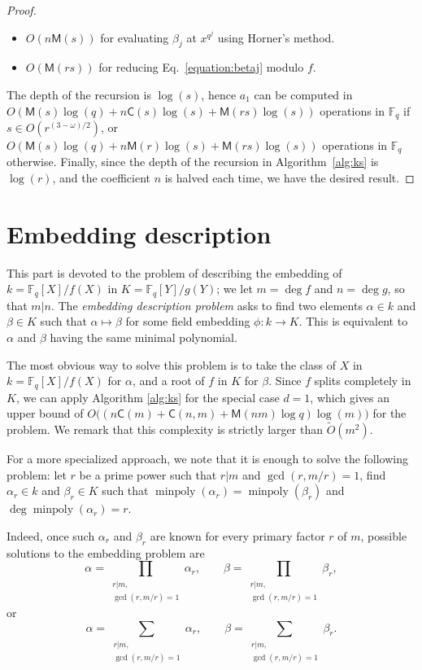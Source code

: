 \documentclass[12pt]{article}
\theoremstyle{plain}
\theoremstyle{definition}
\newcommand{\tildO}{\tilde{O}}
\DeclareMathOperator{\minpoly}{minpoly}
\def\F{\ensuremath{\mathbb{F}}}
\def\MM{\ensuremath{\mathsf{M}}}
\def\CC{\ensuremath{\mathsf{C}}}
\begin{document}
\begin{proof}
\begin{itemize}
	\item $O(n\MM(s))$ for evaluating $\beta_j$ at $x^{q^j}$ using Horner's method.
	\item $O(\MM(rs))$ for reducing Eq.~\eqref{equation:betaj} modulo $f$.
\end{itemize}
The depth of the recursion is $\log(s)$, hence $a_1$ can be computed in $O(\MM(s)\log(q) + 
n\CC(s)\log(s) + \MM(rs)\log(s))$ operations in $\F_q$ if $s \in O(r^{(3 - \omega) / 2})$, or
$O(\MM(s)\log(q) + n\MM(r)\log(s) + \MM(rs)\log(s))$ operations in $\F_q$ otherwise. Finally, since 
the depth of the recursion in Algorithm~\ref{alg:ks} is $\log(r)$, and the coefficient $n$ is 
halved each time, we have the desired result.
\end{proof}









\part{Embedding description}

This part is devoted to the problem of describing the embedding of
$k=\F_q[X]/f(X)$ in $K=\F_q[Y]/g(Y)$; we let $m=\deg f$ and
$n=\deg g$, so that $m|n$. The \emph{embedding description problem}
asks to find two elements $\alpha\in k$ and $\beta\in K$ such that
$\alpha\mapsto\beta$ for some field embedding $\phi:k\to K$. This is
equivalent to $\alpha$ and $\beta$ having the same minimal polynomial.

The most obvious way to solve this problem is to take the class of $X$
in $k=\F_q[X]/f(X)$ for $\alpha$, and a root of $f$ in $K$ for
$\beta$. Since $f$ splits completely in $K$, we can apply Algorithm
\ref{alg:ks} for the special case $d = 1$, which gives an upper bound
of $O\bigl((n\CC(m) + \CC(n,m) + \MM(nm)\log q)\log(m)\bigr)$ for the
problem. We remark that this complexity is strictly larger than
$\tildO(m^2)$.

For a more specialized approach, we note that it is enough to solve
the following problem: let $r$ be a prime power such that $r|m$ and
$\gcd(r,m/r)=1$, find $\alpha_r\in k$ and $\beta_r\in K$ such that
$\minpoly(\alpha_r)=\minpoly(\beta_r)$ and $\deg\minpoly(\alpha_r)=r$.

Indeed, once such $\alpha_r$ and $\beta_r$ are known for every primary
factor $r$ of $m$, possible solutions to the embedding problem are
\begin{equation*}
  \alpha = \prod_{\substack{r|m,\\\gcd(r,m/r)=1}}\alpha_r,\qquad
  \beta = \prod_{\substack{r|m,\\\gcd(r,m/r)=1}}\beta_r,
\end{equation*}
or
\begin{equation*}
  \alpha = \sum_{\substack{r|m,\\\gcd(r,m/r)=1}}\alpha_r,\qquad
  \beta = \sum_{\substack{r|m,\\\gcd(r,m/r)=1}}\beta_r.
\end{equation*}
\end{document}
